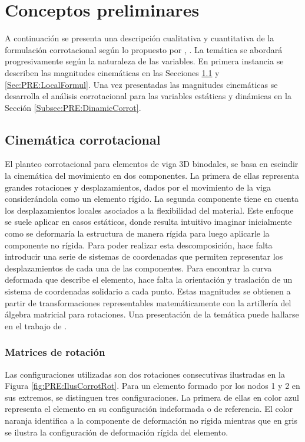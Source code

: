 \chapter{Conceptos preliminares}\label{Cap:Preliminares}


A continuación se presenta una descripción cualitativa y cuantitativa de la formulación corrotacional según lo propuesto por \cite{Le2014}, \citep{Battini2002}. La temática se abordará progresivamente según la naturaleza de las variables. En primera instancia se describen las magnitudes cinemáticas en las Secciones \ref{Subsec:PRE:CienmaticCorrot} y \ref{Sec:PRE:LocalFormul}. Una vez presentadas las magnitudes cinemáticas se desarrolla el análisis corrotacional para las variables estáticas y dinámicas en la Sección \ref{Subsec:PRE:DinamicCorrot}.


\section{Cinemática corrotacional}\label{Subsec:PRE:CienmaticCorrot}


El planteo corrotacional para elementos de viga 3D binodales, se basa en escindir la cinemática del movimiento en dos componentes. La primera de ellas representa grandes rotaciones y desplazamientos, dados por el movimiento de la viga considerándola como un elemento rígido. La segunda componente tiene en cuenta los desplazamientos locales asociados a la flexibilidad del material. Este enfoque se suele aplicar en casos estáticos, donde resulta intuitivo imaginar inicialmente como se deformaría la estructura de manera rígida para luego aplicarle la componente no rígida. Para poder realizar esta descomposición, hace falta introducir una serie de sistemas de coordenadas que permiten representar los desplazamientos de cada una de las componentes. Para encontrar la curva deformada que describe el elemento, hace falta la orientación y traslación de un sistema de coordenadas solidario a cada punto. Estas magnitudes se obtienen a partir de transformaciones representables matemáticamente con la artillería del álgebra matricial para rotaciones. Una presentación de la temática puede hallarse en el trabajo de \cite{kovzar1995finite}.

\subsection{Matrices de rotación}

Las configuraciones utilizadas son dos rotaciones consecutivas ilustradas en la Figura \ref{fig:PRE:IlusCorrotRot}. Para un elemento formado por los nodos 1 y 2 en sus extremos, se distinguen tres configuraciones. La primera de ellas en color azul representa el elemento en su configuración indeformada o de referencia. El color naranja identifica a la componente de deformación no rígida mientras que en gris se ilustra la configuración de deformación rígida del elemento.

